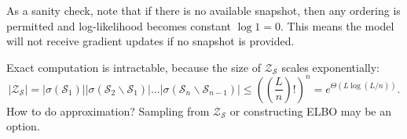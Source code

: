 As a sanity check, note that if there is no available snapshot, then any ordering is permitted and log-likelihood becomes constant $\log1=0$. This means the model will not receive gradient updates if no snapshot is provided.

Exact computation is intractable, because the size of $\mathcal Z_\mathcal S$ scales exponentially: $$|\mathcal Z_\mathcal S|=|\sigma(\mathcal S_1)||\sigma(\mathcal S_2\backslash\mathcal S_1)|...|\sigma(\mathcal S_n\backslash\mathcal S_{n-1})|\leq\left(\left(\frac{L}{n}\right)!\right)^n=e^{\Theta(L\log(L/n))}.$$ How to do approximation? Sampling from $\mathcal Z_\mathcal S$ or constructing ELBO may be an option.
